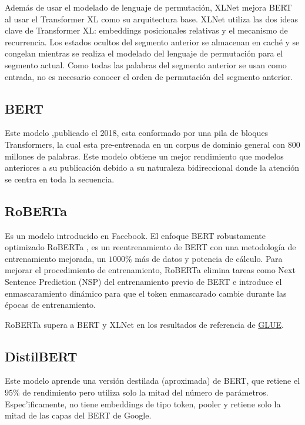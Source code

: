 \documentclass[conference]{IEEEtran}
\begin{document}
\vspace{0.2cm}

Adem\'as de usar el modelado de lenguaje de permutaci\'on, XLNet mejora BERT  al usar el Transformer XL como su arquitectura base. XLNet utiliza las dos ideas clave de Transformer XL: embeddings posicionales relativas y el mecanismo de recurrencia. Los estados ocultos del segmento anterior se almacenan en cach\'e y se congelan mientras se realiza el modelado del lenguaje de permutaci\'on para el segmento actual. Como todas las palabras del segmento anterior se usan como entrada, no es necesario conocer el orden de permutaci\'on del segmento anterior.
	
\subsection{BERT}

Este modelo \cite{b9},publicado el 2018, esta conformado por una pila de bloques Transformers, la cual esta pre-entrenada en un corpus de dominio general con 800 millones de palabras. 
Este modelo obtiene un mejor rendimiento que modelos anteriores a su publicación debido a su naturaleza bidireccional donde la atención se centra en toda la secuencia. 

\subsection{RoBERTa}

Es un modelo introducido en Facebook. El enfoque BERT robustamente optimizado RoBERTa \cite{b10}, es un reentrenamiento de BERT con una metodolog\'ia de entrenamiento mejorada, un $1000\%$ más de datos y potencia de cálculo. Para mejorar el procedimiento de entrenamiento, RoBERTa elimina tareas como Next Sentence Prediction (NSP) del entrenamiento previo de BERT e introduce el enmascaramiento dinámico para que el token enmascarado cambie durante las \'epocas de entrenamiento. 

\vspace{0.2cm}

RoBERTa supera a BERT y XLNet en los resultados de referencia de \href{https://gluebenchmark.com/}{GLUE}.

\subsection{DistilBERT}

Este modelo aprende una versión destilada (aproximada) de BERT, que retiene el $95\%$ de rendimiento pero utiliza solo la mitad del n\'umero de par\'ametros. Espec'ificamente, no tiene embeddings de tipo token, pooler y retiene solo la mitad de las capas del BERT de Google.
\end{document}
